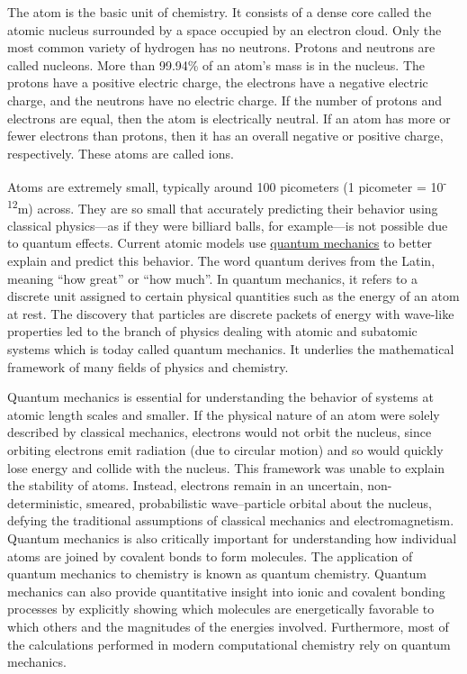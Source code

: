 The atom is the basic unit of chemistry. It consists of a dense core called the atomic nucleus surrounded by a space occupied by an electron cloud. Only the most common variety of hydrogen has no neutrons. Protons and neutrons are called nucleons. More than 99.94\% of an atom's mass is in the nucleus. The protons have a positive electric charge, the electrons have a negative electric charge, and the neutrons have no electric charge. If the number of protons and electrons are equal, then the atom is electrically neutral. If an atom has more or fewer electrons than protons, then it has an overall negative or positive charge, respectively. These atoms are called ions.

Atoms are extremely small, typically around 100 picometers (1 picometer = 10\textsuperscript{-12}m) across. They are so small that accurately predicting their behavior using classical physics---as if they were billiard balls, for example---is not possible due to quantum effects. Current atomic models use \href{https://en.wikipedia.org/wiki/Quantum_mechanics}{quantum mechanics} to better explain and predict this behavior. The word quantum derives from the Latin, meaning ``how great'' or ``how much''. In quantum mechanics, it refers to a discrete unit assigned to certain physical quantities such as the energy of an atom at rest. The discovery that particles are discrete packets of energy with wave-like properties led to the branch of physics dealing with atomic and subatomic systems which is today called quantum mechanics. It underlies the mathematical framework of many fields of physics and chemistry.

Quantum mechanics is essential for understanding the behavior of systems at atomic length scales and smaller. If the physical nature of an atom were solely described by classical mechanics, electrons would not orbit the nucleus, since orbiting electrons emit radiation (due to circular motion) and so would quickly lose energy and collide with the nucleus. This framework was unable to explain the stability of atoms. Instead, electrons remain in an uncertain, non-deterministic, smeared, probabilistic wave--particle orbital about the nucleus, defying the traditional assumptions of classical mechanics and electromagnetism.
Quantum mechanics is also critically important for understanding how individual atoms are joined by covalent bonds to form molecules. The application of quantum mechanics to chemistry is known as quantum chemistry. Quantum mechanics can also provide quantitative insight into ionic and covalent bonding processes by explicitly showing which molecules are energetically favorable to which others and the magnitudes of the energies involved. Furthermore, most of the calculations performed in modern computational chemistry rely on quantum mechanics.



